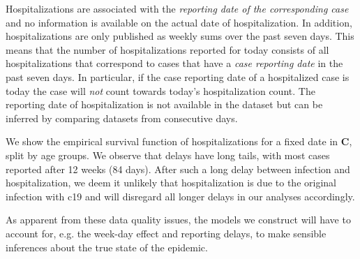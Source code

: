 Hospitalizations are associated with the \emph{reporting date of the corresponding case} and no information is available on the actual date of hospitalization. In addition, hospitalizations are only published as weekly sums over the past seven days. This means that the number of hospitalizations reported for today consists of all hospitalizations that correspond to cases that have a \emph{case reporting date} in the past seven days. In particular, if the case reporting date of a hospitalized case is today the case will \emph{not} count towards today's hospitalization count. The reporting date of hospitalization is not available in the dataset but can be inferred by comparing datasets from consecutive days.

We show the empirical survival function of hospitalizations for a fixed date in  \textbf{C}, split by age groups. We observe that delays have long tails, with most cases reported after 12 weeks (84 days). After such a long delay between infection and hospitalization, we deem it unlikely that hospitalization is due to the original infection with \acrshort{c19} and will disregard all longer delays in our analyses accordingly. 


As apparent from these data quality issues, the models we construct will have to account for, e.g. the week-day effect and reporting delays, to make sensible inferences about the true state of the epidemic. 